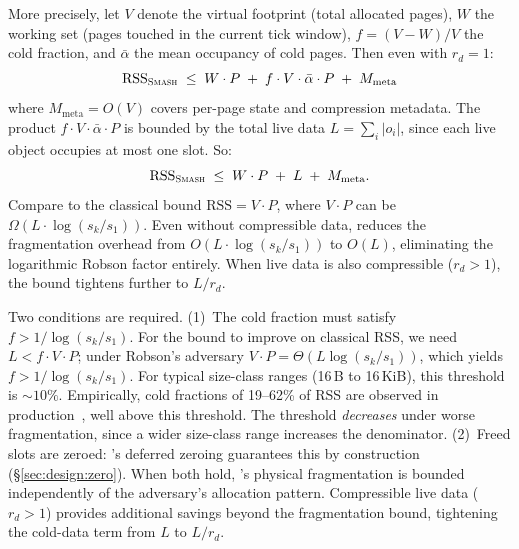 More precisely, let $V$ denote the virtual footprint (total allocated
pages), $W$ the working set (pages touched in the current tick
window), $f = (V - W)/V$ the cold fraction, and $\bar{\alpha}$ the
mean occupancy of cold pages.  Then even with $r_d = 1$:
\[
  \text{RSS}_{\textsc{Smash}} \;\leq\; W \cdot P \;+\; f \cdot V \cdot \bar{\alpha} \cdot P \;+\; M_{\text{meta}}
\]
where $M_{\text{meta}} = O(V)$ covers per-page state and compression
metadata.  The product $f \cdot V \cdot \bar{\alpha} \cdot P$ is
bounded by the total live data $L = \sum_i |o_i|$, since each live
object occupies at most one slot.  So:
\[
  \text{RSS}_{\textsc{Smash}} \;\leq\; W \cdot P \;+\; L \;+\; M_{\text{meta}}.
\]
Compare to the classical bound $\text{RSS} = V \cdot P$, where
$V \cdot P$ can be $\Omega(L \cdot \log(s_k/s_1))$.
Even without compressible data, \sys reduces the fragmentation
overhead from $O(L \cdot \log(s_k/s_1))$ to $O(L)$, eliminating
the logarithmic Robson factor entirely.  When live data is also
compressible ($r_d > 1$), the bound tightens further to $L / r_d$.

Two conditions are required.
(1)~The cold fraction must satisfy $f > 1/\log(s_k/s_1)$.
For the bound to improve on classical RSS, we need
$L < f \cdot V \cdot P$;
under Robson's adversary $V \cdot P = \Theta(L \log(s_k/s_1))$,
which yields $f > 1/\log(s_k/s_1)$.  For typical size-class ranges
(16\,B to 16\,KiB), this threshold is ${\sim}10\%$.  Empirically,
cold fractions of 19--62\% of RSS are observed in
production~\cite{weiner2022tmo}, well above this threshold.  The
threshold \emph{decreases} under worse fragmentation, since a
wider size-class range increases the denominator.
(2)~Freed slots are zeroed: \sys's deferred zeroing guarantees this
by construction (\S\ref{sec:design:zero}).
When both hold, \sys's physical fragmentation is bounded
independently of the adversary's allocation pattern.
Compressible live data ($r_d > 1$) provides additional savings
beyond the fragmentation bound, tightening the cold-data term from
$L$ to $L/r_d$.

